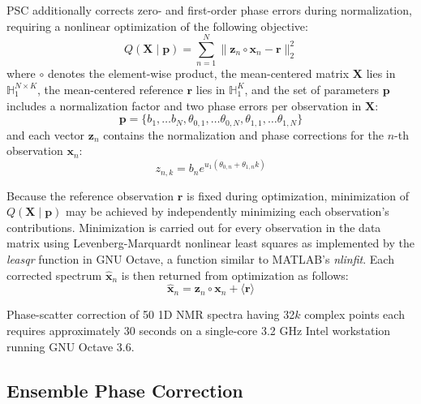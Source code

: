 \begin{doublespace}
PSC additionally corrects zero- and first-order phase errors during
normalization, requiring a nonlinear optimization of the following objective:
\begin{equation}
Q(\mathbf{X} \mid \mathbf{p})
 = \sum_{n=1}^N \| \mathbf{z}_n \circ \mathbf{x}_n - \mathbf{r} \|_2^2
\end{equation}
where $\circ$ denotes the element-wise product, the mean-centered matrix
$\mathbf{X}$ lies in $\mathbb{H}_1^{N \times K}$, the mean-centered reference
$\mathbf{r}$ lies in $\mathbb{H}_1^K$, and the set of parameters $\mathbf{p}$
includes a normalization factor and two phase errors per observation
in $\mathbf{X}$:
\begin{equation}
\mathbf{p} = \{
  b_1, \dots b_N,
  \theta_{0,1}, \dots \theta_{0,N},
  \theta_{1,1}, \dots \theta_{1,N} \}
\end{equation}
and each vector $\mathbf{z}_n$ contains the normalization and phase corrections
for the $n$-th observation $\mathbf{x}_n$:
\begin{equation}
z_{n,k} = b_n e^{u_1 (\theta_{0,n} + \theta_{1,n} k)}
\end{equation}

Because the reference observation $\mathbf{r}$ is fixed during optimization,
minimization of $Q(\mathbf{X} \mid \mathbf{p})$ may be achieved by
independently minimizing each observation's contributions. Minimization is
carried out for every observation in the data matrix using Levenberg-Marquardt
nonlinear least squares \cite{marquardt:jsiam1963} as implemented by the
{\it leasqr} function in GNU Octave, a function similar to MATLAB's
{\it nlinfit}. Each corrected spectrum $\hat{\mathbf{x}}_n$ is then returned
from optimization as follows:
\begin{equation}
\hat{\mathbf{x}}_n
 = \mathbf{z}_n \circ \mathbf{x}_n
 + \langle \mathbf{r} \rangle
\end{equation}

Phase-scatter correction of 50 1D \hnmr{} NMR spectra having 32$k$ complex
points each requires approximately 30 seconds on a single-core 3.2 GHz Intel
workstation running GNU Octave 3.6.
\end{doublespace}

\subsection{Ensemble Phase Correction}

